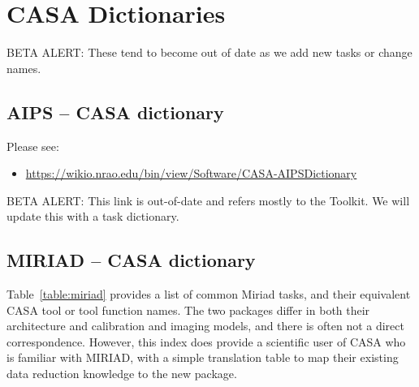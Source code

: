

\chapter[Appendix: CASA Dictionaries]{CASA Dictionaries}
\label{chapter:dict}

{BETA ALERT:} These tend to become out of date as we add new tasks
or change names.

\section{AIPS -- CASA dictionary}
\label{section:dict.aips}

Please see: 
\begin{itemize}
  \item \url{https://wikio.nrao.edu/bin/view/Software/CASA-AIPSDictionary}
\end{itemize}

{BETA ALERT:} This link is out-of-date and refers mostly to the 
Toolkit.  We will update this with a task dictionary.

\section{MIRIAD -- CASA dictionary}
\label{section:dict.miriad}

Table~\ref{table:miriad} provides a list of common Miriad tasks, and their
equivalent CASA tool or tool function names. The two packages differ
in both their architecture and calibration and imaging models, and
there is often not a direct correspondence. However, this index does
provide a scientific user of CASA who is familiar with MIRIAD, with
a simple translation table to map their existing data reduction
knowledge to the new package.

